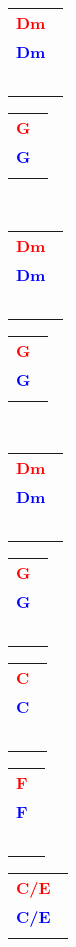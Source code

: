 \documentclass[12pt,a4paper,openany,UTF8]{memoir}
\begin{document}
   \begin{tabular}[b]{l}
    \textbf{\textcolor{red}{Dm\ }}\\\textbf{\textcolor{blue}{Dm\ }}\\
    ~\mbox{}\end{tabular}\begin{tabular}[b]{l}
    \textbf{\textcolor{red}{G\ }}\\\textbf{\textcolor{blue}{G\ }}\\
    \mbox{}\end{tabular}\\
\begin{tabular}[b]{l}
    \textbf{\textcolor{red}{Dm\ }}\\\textbf{\textcolor{blue}{Dm\ }}\\
    ~\mbox{}\end{tabular}\begin{tabular}[b]{l}
    \textbf{\textcolor{red}{G\ }}\\\textbf{\textcolor{blue}{G\ }}\\
    \mbox{}\end{tabular}\\
\begin{tabular}[b]{l}
    \textbf{\textcolor{red}{Dm\ }}\\\textbf{\textcolor{blue}{Dm\ }}\\
    ~\mbox{}\end{tabular}\begin{tabular}[b]{l}
    \textbf{\textcolor{red}{G\ }}\\\textbf{\textcolor{blue}{G\ }}\\
    ~\mbox{}\end{tabular}\begin{tabular}[b]{l}
    \textbf{\textcolor{red}{C\ }}\\\textbf{\textcolor{blue}{C\ }}\\
    ~\mbox{}\end{tabular}\begin{tabular}[b]{l}
    \textbf{\textcolor{red}{F\ }}\\\textbf{\textcolor{blue}{F\ }}\\
    ~\mbox{}\end{tabular}\begin{tabular}[b]{l}
    \textbf{\textcolor{red}{C/E\ }}\\\textbf{\textcolor{blue}{C/E\ }}\\
    \mbox{}\end{tabular}\\
\end{document}
